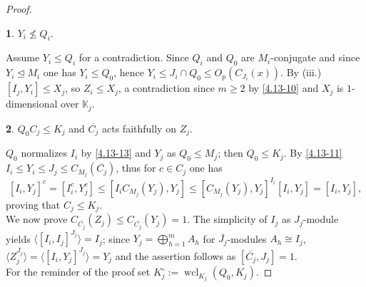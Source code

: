 \documentclass{amsart}
\numberwithin{equation}{section}
\theoremstyle{definition}
\theoremstyle{subresult}
\newtheorem{subresult}{}[equation]
\theoremstyle{caseresult}
\newcommand{\bK}{\mathbb{K}}
\newcommand{\wcl}{\operatorname{wcl}}
\newcommand{\ov}{\overline}
\newcommand{\norm}{\trianglelefteq}
\newcommand{\<}{\langle}
\renewcommand{\>}{\rangle}
\begin{document}
\begin{proof}
	\begin{subresult}\label{4.13-17}
		$Y_i \not \le Q_i$.
	\end{subresult}
	Assume $Y_i \le Q_i$ for a contradiction. Since $Q_i$ and $Q_0$ are $M_i$-conjugate and since $Y_i \norm M_i$ one has $Y_i \le Q_0$, hence $Y_i \le J_i \cap Q_0 \le O_p(C_{J_i}(x))$. By (iii.) $[I_j,Y_i] \le X_j$, so $Z_i \le X_j$, a contradiction since $m \ge 2$ by \eqref{4.13-10} and $X_j$ is $1$-dimensional over $\bK_j$.
	
	\begin{subresult}\label{4.13-18}
		$Q_0C_j \le K_j$ and $\ov{C_j}$ acts faithfully on $Z_j$.
	\end{subresult}
	$Q_0$ normalizes $I_i$ by \eqref{4.13-13} and $Y_j$ as $Q_0 \le M_j$; then $Q_0 \le K_j$. By \eqref{4.13-11} $I_i \le Y_i \le  J_j \le C_{M_j}(\ov{C_j})$, thus for $c \in C_j$ one has 
	\[
	[I_i,Y_j]^c = [I_i^c,Y_j^c] \le [I_iC_{M_j}(Y_j), Y_j] \le [C_{M_j}(Y_j),Y_j]^{I_i} [I_i,Y_j] =[I_i,Y_j],
	\]
	proving that $C_j \le K_j$.\\
	We now prove $C_{\ov{C_j}}(Z_j) \le C_{\ov{C_j}}(Y_j) = 1$. The simplicity of $I_j$ as $J_j$-module yields $\< [I_i,I_j]^{J_j} \> = I_j$; since $Y_j=\bigoplus_{h=1}^m A_h$ for $\ov{J_j}$-modules $A_h \cong I_j$, $\< Z_j^{J_j} \> =\< [I_i, Y_j]^{J_j} \>  = Y_j$ and the assertion follows as $[\ov{C_j},J_j] =1$.\\
	
	For the reminder of the proof set $K_j^\circ := \wcl_{K_j}(Q_0,K_j)$.
	

\end{proof}
\end{document}
